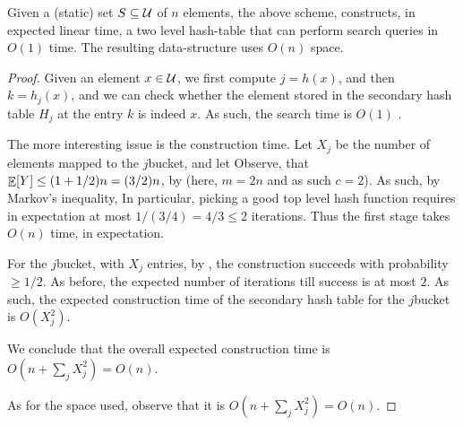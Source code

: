\begin{theorem}
    Given a (static) set $S \subseteq \mathcal{U}$ of $n$ elements, the above
    scheme, constructs, in expected linear time, a two level
    hash-table that can perform search queries in $O(1)$  time. The
    resulting data-structure uses $O(n)$ space.
\end{theorem}
\begin{proof}   
    Given an element $x \in \mathcal{U}$, we first compute $j = h(x)$, and
    then $k = h_j(x)$, and we can check whether the element stored in
    the secondary hash table $H_j$ at the entry $k$ is indeed $x$. As
    such, the search time is $O(1)$ .

    The more interesting issue is the construction time.  Let $X_j$ be
    the number of elements mapped to the $j$\th bucket, and let
      Observe, that
    $\mathop{\mathbb{E}}\!\left[ {Y} \right] \leq (1+ 1/2)n =(3/ 2)n$, by 
    (here, $m=2n$ and as such $c=2$). As such, by Markov's inequality,
     In particular,
    picking a good top level hash function requires in expectation at
    most $1/(3/4)=4/3 \leq 2$ iterations. Thus the first stage takes
    $O(n)$ time, in expectation.

    For the $j$\th bucket, with $X_j$ entries, by
    , the construction succeeds with probability
    $\geq 1/2$. As before, the expected number of iterations till
    success is at most $2$. As such, the expected construction time of
    the secondary hash table for the $j$\th bucket is $O(X_j^2)$.

    We conclude that the overall expected construction time is
    $O( n + \sum_j X_j^2 ) = O(n)$.

    As for the space used, observe that it is $O(n + \sum_j X_j^2 ) =
    O(n)$.    
\end{proof}



